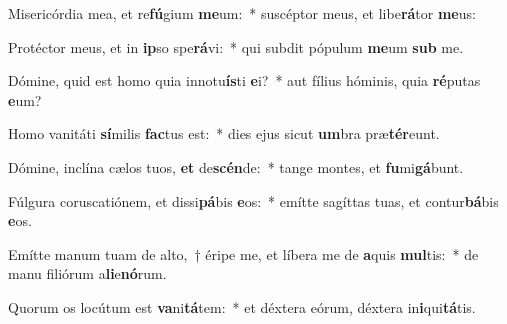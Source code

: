 \item Misericórdia mea, et re\textbf{fú}gium \textbf{me}um:~* suscéptor meus, et libe\textbf{rá}tor \textbf{me}us:
\item Protéctor meus, et in \textbf{ip}so spe\textbf{rá}vi:~* qui subdit pópulum \textbf{me}um \textbf{sub} me.
\item Dómine, quid est homo quia innotu\textbf{ís}ti \textbf{e}i?~* aut fílius hóminis, quia \textbf{ré}putas \textbf{e}um?
\item Homo vanitáti \textbf{sí}milis \textbf{fac}tus est:~* dies ejus sicut \textbf{um}bra præ\textbf{tér}eunt.
\item Dómine, inclína cælos tuos, \textbf{et} de\textbf{scén}de:~* tange montes, et \textbf{fu}mi\textbf{gá}bunt.
\item Fúlgura coruscatiónem, et dissi\textbf{pá}bis \textbf{e}os:~* emítte sagíttas tuas, et contur\textbf{bá}bis \textbf{e}os.
\item Emítte manum tuam de alto,~† éripe me, et líbera me de \textbf{a}quis \textbf{mul}tis:~* de manu filiórum a\textbf{li}e\textbf{nó}rum.
\item Quorum os locútum est \textbf{va}ni\textbf{tá}tem:~* et déxtera eórum, déxtera in\textbf{i}qui\textbf{tá}tis.
